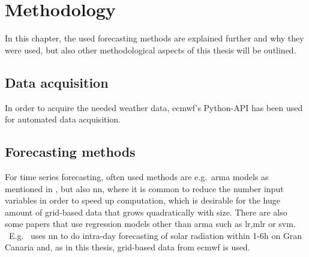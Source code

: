 \chapter{Methodology}
\label{ch:methods}

In this chapter, the used forecasting methods are explained further and why they were used, but also other methodological aspects of this thesis will be outlined.\\


\section{Data acquisition}
\label{sec:dataq}

In order to acquire the needed weather data, \gls{ecmwf}'s Python-API has been used for automated data acquisition.\\

\section{Forecasting methods}
\label{sec:forecastmet}

For time series forecasting, often used methods are e.g.\ \gls{arma} models as mentioned in , but  also \gls{nn}, where it is common to reduce the number input variables in order to speed up computation, which is desirable for the huge amount of grid-based data that grows quadratically with size. There are also some papers that use regression models other than \gls{arma} such as \gls{lr},\gls{mlr} or \gls{svm}.\\\
E.g.\  uses \gls{nn} to do intra-day forecasting of solar radiation within 1-6h on Gran Canaria and, as in this thesis, grid-based data from \gls{ecmwf} is used.\\

